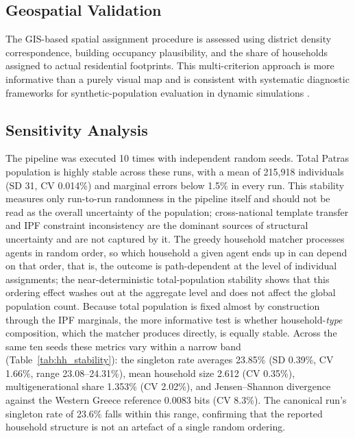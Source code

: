 \documentclass{article}
\begin{document}
\subsection{Geospatial Validation}\label{geospatial-validation}

The GIS-based spatial assignment procedure is assessed using district density correspondence, building occupancy plausibility, and the share of households assigned to actual residential footprints. This multi-criterion approach is more informative than a purely visual map and is consistent with systematic diagnostic frameworks for synthetic-population evaluation in dynamic simulations \citep{Bigi2024}.

\subsection{Sensitivity Analysis}\label{sensitivity-analysis}

The pipeline was executed 10 times with independent random seeds. Total Patras population is highly stable across these runs, with a mean of 215,918 individuals (SD 31, CV 0.014\%) and marginal errors below 1.5\% in every run. This stability measures only run-to-run randomness in the pipeline itself and should not be read as the overall uncertainty of the population; cross-national template transfer and IPF constraint inconsistency are the dominant sources of structural uncertainty and are not captured by it. The greedy household matcher processes agents in random order, so which household a given agent ends up in can depend on that order, that is, the outcome is path-dependent at the level of individual assignments; the near-deterministic total-population stability shows that this ordering effect washes out at the aggregate level and does not affect the global population count. Because total population is fixed almost by construction through the IPF marginals, the more informative test is whether household-\emph{type} composition, which the matcher produces directly, is equally stable. Across the same ten seeds these metrics vary within a narrow band (Table~\ref{tab:hh_stability}): the singleton rate averages 23.85\% (SD 0.39\%, CV 1.66\%, range 23.08--24.31\%), mean household size 2.612 (CV 0.35\%), multigenerational share 1.353\% (CV 2.02\%), and Jensen--Shannon divergence against the Western Greece reference 0.0083 bits (CV 8.3\%). The canonical run's singleton rate of 23.6\% falls within this range, confirming that the reported household structure is not an artefact of a single random ordering.
\end{document}
